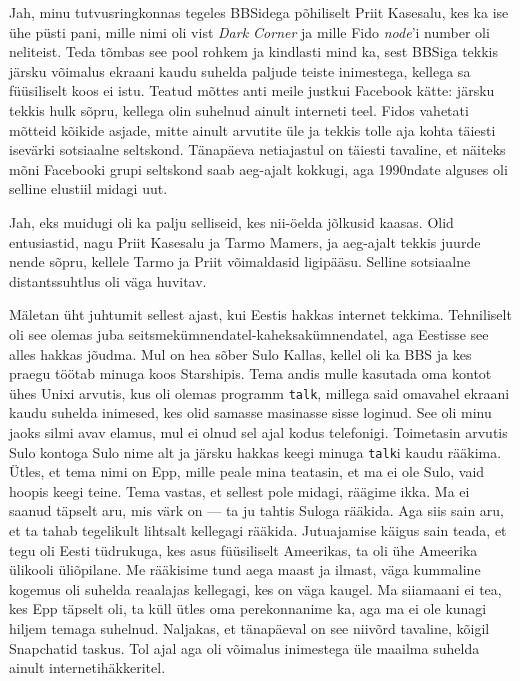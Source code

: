 Jah, minu tutvusringkonnas tegeles BBSidega põhiliselt Priit 
Kasesalu, kes 
ka ise ühe püsti pani, mille nimi oli vist \emph{Dark Corner} ja mille Fido \emph{node}'i number oli neliteist. 
Teda tõmbas see pool rohkem ja 
kindlasti mind ka, sest BBSiga tekkis järsku võimalus ekraani kaudu suhelda 
paljude teiste inimestega, kellega sa füüsiliselt koos ei istu. 
Teatud mõttes anti meile justkui 
Facebook kätte: 
järsku tekkis hulk sõpru, kellega olin suhelnud ainult interneti teel. Fidos 
vahetati mõtteid kõikide asjade, mitte ainult arvutite üle ja tekkis 
tolle aja kohta täiesti isevärki sotsiaalne seltskond. Tänapäeva netiajastul on 
täiesti tavaline, et näiteks mõni Facebooki grupi seltskond saab aeg-ajalt 
kokkugi, aga 1990ndate alguses oli selline elustiil midagi uut.


Jah, eks muidugi oli ka palju selliseid, kes nii-öelda jõlkusid kaasas. Olid 
entusiastid, nagu Priit Kasesalu 
ja Tarmo Mamers, ja aeg-ajalt tekkis juurde nende 
sõpru, kellele Tarmo ja Priit võimaldasid 
ligipääsu. Selline sotsiaalne 
distantssuhtlus oli väga huvitav. 

Mäletan üht juhtumit sellest ajast, kui Eestis hakkas internet tekkima. 
Tehniliselt oli see olemas juba 
seitsmekümnendatel-kaheksakümnendatel, aga Eestisse see alles hakkas jõudma. 
Mul on hea sõber 
Sulo Kallas, kellel oli ka BBS ja kes praegu 
töötab minuga koos Starshipis. Tema andis 
mulle kasutada oma kontot ühes Unixi arvutis, kus oli olemas 
programm \verb|talk|, millega said omavahel ekraani kaudu suhelda 
inimesed, kes olid samasse masinasse sisse loginud. See oli minu 
jaoks silmi avav elamus, mul ei olnud sel ajal 
kodus telefonigi. Toimetasin arvutis Sulo kontoga Sulo nime alt 
ja järsku hakkas keegi minuga \verb|talk|i kaudu 
rääkima. Ütles, et tema nimi on Epp, mille peale mina teatasin, et ma ei ole 
Sulo, vaid hoopis keegi
teine. Tema vastas, et sellest pole midagi, räägime ikka. Ma ei 
saanud täpselt aru, mis värk on --- ta ju tahtis Suloga rääkida. Aga siis sain 
aru, et ta tahab tegelikult lihtsalt kellegagi 
rääkida.  
Jutuajamise käigus sain teada, et  
tegu oli Eesti tüdrukuga, kes asus füüsiliselt 
Ameerikas, ta oli ühe Ameerika ülikooli üliõpilane. 
Me rääkisime tund aega maast ja ilmast, väga kummaline kogemus oli suhelda 
reaalajas kellegagi, kes on väga kaugel. Ma siiamaani ei tea, 
kes Epp täpselt oli, ta küll ütles oma perekonnanime ka, aga ma ei ole kunagi 
hiljem temaga suhelnud. Naljakas, et 
tänapäeval on see niivõrd tavaline, kõigil Snapchatid taskus. Tol ajal aga oli 
võimalus 
inimestega üle maailma suhelda ainult internetihäkkeritel.


